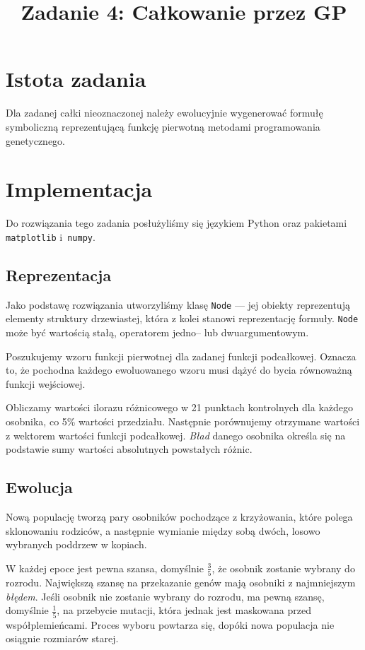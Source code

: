 \documentclass{classrep2}
\author{
  \studentinfo{Cezar Pokorski}{138077} \and
  \studentinfo{Artur Czajka}{137971}
}
\title{Zadanie 4: Całkowanie przez GP}
\begin{document}
\maketitle

\section{Istota zadania}
Dla zadanej całki nieoznaczonej należy ewolucyjnie wygenerować formułę symboliczną reprezentującą funkcję pierwotną metodami programowania genetycznego.

\section{Implementacja}
Do rozwiązania tego zadania posłużyliśmy się językiem Python oraz pakietami \texttt{matplotlib} i~\texttt{numpy}.

\subsection{Reprezentacja}
Jako podstawę rozwiązania utworzyliśmy klasę \texttt{Node} --- jej obiekty reprezentują elementy struktury drzewiastej, która z kolei stanowi reprezentację formuły. \texttt{Node} może być wartością stałą, operatorem jedno-- lub dwuargumentowym.

Poszukujemy wzoru funkcji pierwotnej dla zadanej funkcji podcałkowej. Oznacza to, że pochodna każdego ewoluowanego wzoru musi dążyć do bycia równoważną funkcji wejściowej.

Obliczamy wartości ilorazu różnicowego w 21 punktach kontrolnych dla każdego osobnika, co 5\% wartości przedziału. Następnie porównujemy otrzymane wartości z wektorem wartości funkcji podcałkowej. \textit{Bład} danego osobnika określa się na podstawie sumy wartości absolutnych powstałych różnic.

\subsection{Ewolucja}
Nową populację tworzą pary osobników pochodzące z krzyżowania, które polega sklonowaniu rodziców, a następnie wymianie między sobą dwóch, losowo wybranych poddrzew w kopiach.

W każdej epoce jest pewna szansa, domyślnie $\frac{3}{5}$, że osobnik zostanie wybrany do rozrodu. Największą szansę na przekazanie genów mają osobniki z najmniejszym \textit{błędem}. Jeśli osobnik nie zostanie wybrany do rozrodu, ma pewną szansę, domyślnie $\frac{1}{5}$, na przebycie mutacji, która jednak jest maskowana przed współplemieńcami. Proces wyboru powtarza się, dopóki nowa populacja nie osiągnie rozmiarów starej.
\end{document}
